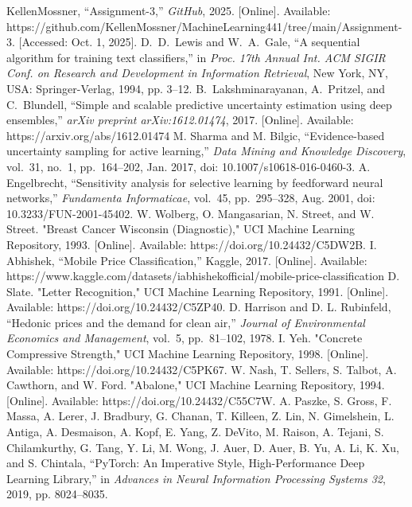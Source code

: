 \documentclass[conference]{IEEEtran}
\begin{document}
	\begin{thebibliography}{00}
		 KellenMossner, ``Assignment-3,'' \textit{GitHub}, 2025. [Online]. Available: https://github.com/KellenMossner/MachineLearning441/tree/main/Assignment-3. [Accessed: Oct. 1, 2025].
		 D.~D.~Lewis and W.~A.~Gale, ``A sequential algorithm for training text classifiers,'' in \emph{Proc. 17th Annual Int. ACM SIGIR Conf. on Research and Development in Information Retrieval}, New York, NY, USA: Springer-Verlag, 1994, pp. 3--12.
		 B.~Lakshminarayanan, A.~Pritzel, and C.~Blundell, ``Simple and scalable predictive uncertainty estimation using deep ensembles,'' \emph{arXiv preprint arXiv:1612.01474}, 2017. [Online]. Available: https://arxiv.org/abs/1612.01474
		 M. Sharma and M. Bilgic, ``Evidence-based uncertainty sampling for active learning,'' \emph{Data Mining and Knowledge Discovery}, vol.~31, no.~1, pp.~164--202, Jan. 2017, doi: 10.1007/s10618-016-0460-3.
		 A. Engelbrecht, ``Sensitivity analysis for selective learning by feedforward neural networks,'' \emph{Fundamenta Informaticae}, vol.~45, pp.~295--328, Aug. 2001, doi: 10.3233/FUN-2001-45402.
		 W. Wolberg, O. Mangasarian, N. Street, and W. Street. "Breast Cancer Wisconsin (Diagnostic)," UCI Machine Learning Repository, 1993. [Online]. Available: https://doi.org/10.24432/C5DW2B.
		 I. Abhishek, ``Mobile Price Classification,'' Kaggle, 2017. [Online]. Available: https://www.kaggle.com/datasets/iabhishekofficial/mobile-price-classification
		 D. Slate. "Letter Recognition," UCI Machine Learning Repository, 1991. [Online]. Available: https://doi.org/10.24432/C5ZP40.
		 D. Harrison and D. L. Rubinfeld, ``Hedonic prices and the demand for clean air,'' \emph{Journal of Environmental Economics and Management}, vol.~5, pp.~81--102, 1978.
		 I. Yeh. "Concrete Compressive Strength," UCI Machine Learning Repository, 1998. [Online]. Available: https://doi.org/10.24432/C5PK67.
		 W. Nash, T. Sellers, S. Talbot, A. Cawthorn, and W. Ford. "Abalone," UCI Machine Learning Repository, 1994. [Online]. Available: https://doi.org/10.24432/C55C7W.
			A. Paszke, S. Gross, F. Massa, A. Lerer, J. Bradbury, G. Chanan, T. Killeen, Z. Lin, N. Gimelshein, L. Antiga, A. Desmaison, A. Kopf, E. Yang, Z. DeVito, M. Raison, A. Tejani, S. Chilamkurthy, G. Tang, Y. Li, M. Wong, J. Auer, D. Auer, B. Yu, A. Li, K. Xu, and S. Chintala, ``PyTorch: An Imperative Style, High-Performance Deep Learning Library,'' in \textit{Advances in Neural Information Processing Systems 32}, 2019, pp. 8024--8035.
	\end{thebibliography}
	
\end{document}
